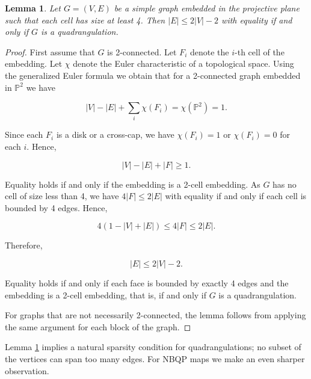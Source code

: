 \documentclass[10pt,a4paper]{article}
\newtheorem{lemma}[theorem]{Lemma}
\newcommand{\Pb}[0]{\mathbb{P}}
\begin{document}
\begin{lemma}\label{lem:2nminus2isquad}
    Let $G=(V,E)$ be a simple graph embedded in the projective plane such that each cell has size at least 4. Then $|E|\le2|V|-2$ with equality if and only if $G$ is a quadrangulation. 
\end{lemma}
\begin{proof}
    First assume that $G$ is 2-connected. Let $F_i$ denote the $i$-th cell of the embedding. Let $\chi$ denote the Euler characteristic of a topological space. Using the generalized Euler formula we obtain that for a 2-connected graph embedded in $\Pb^2$ we have

    $$|V|-|E|+\sum_i\chi (F_i)=\chi(\Pb^2)=1.$$

    Since each $F_i$ is a disk or a cross-cap, we have $\chi(F_i)=1$ or $\chi(F_i)=0$ for each $i$. Hence,

    $$|V|-|E|+|F|\ge 1.$$

    Equality holds if and only if the embedding is a 2-cell embedding.   As $G$ has no cell of size less than 4, we have $4|F|\le 2|E|$ with equality if and only if each cell is bounded by 4 edges. Hence,

     $$ 4(1-|V|+|E|)\le 4|F|\le 2|E|.$$

    Therefore,
    
    $$|E|\le 2|V|-2.$$

    Equality holds if and only if each face is bounded by exactly 4 edges and the embedding is a 2-cell embedding, that is, if and only if $G$ is a quadrangulation.

    For graphs that are not necessarily 2-connected, the lemma follows from applying the same argument for each block of the graph. 


\end{proof}


 Lemma \ref{lem:2nminus2isquad} implies a natural sparsity condition for quadrangulations; no subset of the vertices can span too many edges. For NBQP maps we make an even sharper observation. 
\end{document}
